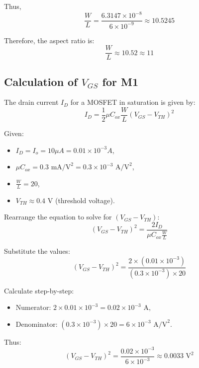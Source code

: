 Thus,
\begin{equation}
    \frac{W}{L} = \frac{6.3147 \times 10^{-8}}{6 \times 10^{-9}} \approx 10.5245
\end{equation}

Therefore, the aspect ratio is:
\begin{equation}
    \frac{W}{L} \approx 10.52 \approx 11
\end{equation}


\subsection{Calculation of $V_{GS}$ for M1}

The drain current $I_D$ for a MOSFET in saturation is given by:
\begin{equation}
    I_D = \frac{1}{2} \mu C_{ox} \frac{W}{L} (V_{GS} - V_{TH})^2
\end{equation}

Given:
\begin{itemize}
    \item $I_D = I_o = 10 \mu A = 0.01 \times 10^{-3} A$,
    \item $\mu C_{ox} = 0.3 \text{ mA/V}^2 = 0.3 \times 10^{-3} \text{ A/V}^2$,
    \item $\frac{W}{L} = 20$,
    \item $V_{TH} \approx 0.4 \text{ V}$ (threshold voltage).
\end{itemize}

Rearrange the equation to solve for $(V_{GS} - V_{TH})$:
\begin{equation}
    (V_{GS} - V_{TH})^2 = \frac{2I_D}{\mu C_{ox} \frac{W}{L}}
\end{equation}

Substitute the values:
\begin{equation}
    (V_{GS} - V_{TH})^2 = \frac{2 \times (0.01 \times 10^{-3})}{(0.3 \times 10^{-3}) \times 20}
\end{equation}

Calculate step-by-step:
\begin{itemize}
    \item Numerator: $2 \times 0.01 \times 10^{-3} = 0.02 \times 10^{-3} \text{ A}$,
    \item Denominator: $(0.3 \times 10^{-3}) \times 20 = 6 \times 10^{-3} \text{ A/V}^2$.
\end{itemize}

Thus:
\begin{equation}
    (V_{GS} - V_{TH})^2 = \frac{0.02 \times 10^{-3}}{6 \times 10^{-3}} \approx 0.0033 \text{ V}^2
\end{equation}

